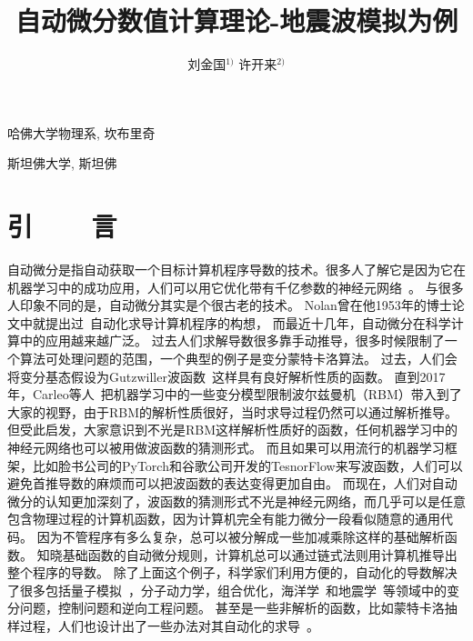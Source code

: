 \documentclass[A4,twoside,fontset=ubuntu,UTF8]{ctexart}
\begin{document}
\apsname

\title{自动微分数值计算理论-地震波模拟为例 \fivestar}%

\author{刘金国$^{1)}$ \quad 许开来$^{2)}$}

\address{1)}{哈佛大学物理系, 坎布里奇 }
\address{2)}{斯坦佛大学, 斯坦佛 }





\cfund{}




{}\baselineskip
\section{引~~~~言}
    自动微分是指自动获取一个目标计算机程序导数的技术。很多人了解它是因为它在机器学习中的成功应用，人们可以用它优化带有千亿参数的神经元网络~\cite{Rosset2019}。
与很多人印象不同的是，自动微分其实是个很古老的技术。
Nolan曾在他1953年的博士论文中就提出过~\cite{Nolan1953}自动化求导计算机程序的构想，
而最近十几年，自动微分在科学计算中的应用越来越广泛。
过去人们求解导数很多靠手动推导，很多时候限制了一个算法可处理问题的范围，一个典型的例子是变分蒙特卡洛算法。
过去，人们会将变分基态假设为Gutzwiller波函数~\cite{Gutzwiller1963}这样具有良好解析性质的函数。
直到2017年，Carleo等人~\cite{Carleo2017}把机器学习中的一些变分模型限制波尔兹曼机（RBM）带入到了大家的视野，由于RBM的解析性质很好，当时求导过程仍然可以通过解析推导。 
但受此启发，大家意识到不光是RBM这样解析性质好的函数，任何机器学习中的神经元网络也可以被用做波函数的猜测形式。
而且如果可以用流行的机器学习框架，比如脸书公司的PyTorch和谷歌公司开发的TesnorFlow来写波函数，人们可以避免首推导数的麻烦而可以把波函数的表达变得更加自由。
而现在，人们对自动微分的认知更加深刻了，波函数的猜测形式不光是神经元网络，而几乎可以是任意包含物理过程的计算机函数，因为计算机完全有能力微分一段看似随意的通用代码。
因为不管程序有多么复杂，总可以被分解成一些加减乘除这样的基础解析函数。
知晓基础函数的自动微分规则，计算机总可以通过链式法则用计算机推导出整个程序的导数。
除了上面这个例子，科学家们利用方便的，自动化的导数解决了很多包括量子模拟~\cite{Luo2019}，分子动力学，组合优化，海洋学~\cite{Heimbach2005}和地震学~\cite{Symes2007,Zhu2020}等领域中的变分问题，控制问题和逆向工程问题。
甚至是一些非解析的函数，比如蒙特卡洛抽样过程，人们也设计出了一些办法对其自动化的求导~\cite{Zhang2019}。
\end{document}
